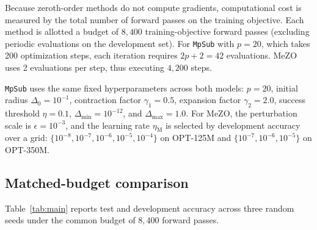 \documentclass{siamart171218}
\begin{document}
Because zeroth-order methods do not compute gradients, computational cost is measured by the total number of forward passes on the training objective. Each method is allotted a budget of $8{,}400$ training-objective forward passes (excluding periodic evaluations on the development set). For \texttt{MpSub} with $p = 20$, which takes 200 optimization steps, each iteration requires $2p + 2 = 42$ evaluations. MeZO uses 2 evaluations per step, thus executing $4{,}200$ steps.

\texttt{MpSub} uses the same fixed hyperparameters across both models: $p = 20$, initial radius $\Delta_0 = 10^{-1}$, contraction factor $\gamma_1 = 0.5$, expansion factor $\gamma_2 = 2.0$, success threshold $\eta = 0.1$, $\Delta_{\min} = 10^{-12}$, and $\Delta_{\max} = 1.0$. For MeZO, the perturbation scale is $\epsilon = 10^{-3}$, and the learning rate $\eta_{\mathrm{M}}$ is selected by development accuracy over a grid: $\{10^{-8}, 10^{-7}, 10^{-6}, 10^{-5}, 10^{-4}\}$ on OPT-125M and $\{10^{-7}, 10^{-6}, 10^{-5}\}$ on OPT-350M.

\subsection{Matched-budget comparison}
\label{subsec:main}

Table~\ref{tab:main} reports test and development accuracy across three random seeds under the common budget of $8{,}400$ forward passes.
\end{document}
